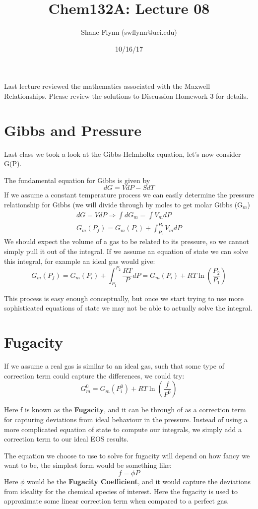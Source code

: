 \documentclass{article}
\title{Chem132A: Lecture 08}
\author{Shane Flynn (swflynn@uci.edu) }
\date{10/16/17}
\newcommand{\be}{\begin{equation}}
\newcommand{\ee}{\end{equation}}
\begin{document}
\maketitle

Last lecture reviewed the mathematics associated with the Maxwell Relationships. 
Please review the solutions to Discussion Homework 3 for details. 

\section*{Gibbs and Pressure}
Last class we took a look at the Gibbs-Helmholtz equation, let's now consider G(P). 

The fundamental equation for Gibbs is given by
\be
dG = VdP - SdT
\ee
If we assume a constant temperature process we can easily determine the pressure relationship for Gibbs (we will divide through by moles to get molar Gibbs (G$_m$) 
\be
\begin{split}
dG = VdP \Rightarrow \int dG_m = \int V_mdP \\
G_m(P_f) = G_m(P_i) + \int_{P_1}^{P_2} V_m dP
\end{split}
\ee
We should expect the volume of a gas to be related to its pressure, so we cannot simply pull it out of the integral. 
If we assume an equation of state we can solve this integral, for example an ideal gas would give:
\be
G_m(P_f) = G_m(P_i) + \int_{P_1}^{P_2} \frac{RT}{P} dP = G_m(P_i) + RT \ln\left(\frac{P_2}{P_1}\right)
\ee

This process is easy enough conceptually, but once we start trying to use more sophisticated equations of state we may not be able to actually solve the integral. 

\section*{Fugacity}
If we assume a real gas is similar to an ideal gas, such that some type of correction term could capture the differences, we could try: 
\be
G_m^0 = G_m(P_i^0) + RT \ln\left(\frac{f}{P^0}\right)
\ee

Here f is known as the \textbf{Fugacity}, and it can be through of as a correction term for capturing deviations from ideal behaviour in the pressure. 
Instead of using a more complicated equation of state to compute our integrals, we simply add a correction term to our ideal EOS results. 

The equation we choose to use to solve for fugacity will depend on how fancy we want to be, the simplest form would be something like:
\be
f = \phi P
\ee
Here $\phi$ would be the \textbf{Fugacity Coefficient}, and it would capture the deviations from ideality for the chemical species of interest. 
Here the fugacity is used to approximate some linear correction term when compared to a perfect gas. 
\end{document}
